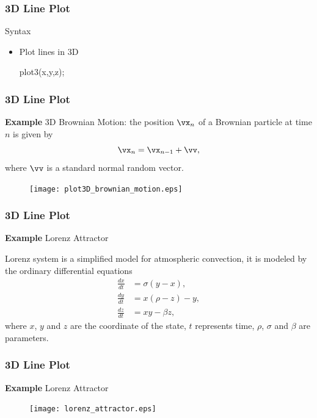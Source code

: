 \documentclass[compress]{beamer}  %
\begin{document}
\begin{frame}[fragile]
\frametitle{3D Line Plot}
\begin{block}{Syntax}
\begin{itemize}
    \item Plot lines in 3D
          \begin{matlabcodebeamer}[numbers=none,frame=none]
          plot3(x,y,z);
          \end{matlabcodebeamer}
\end{itemize}
\end{block}

\end{frame}
\begin{frame}[fragile]
\frametitle{3D Line Plot}
\textbf{Example} 3D Brownian Motion:
the position $\vx_n$ of a Brownian particle at time $n$ is given by
\begin{equation}
    \vx_n = \vx_{n-1} + \vv,
\end{equation}
where $\vv$ is a standard normal random vector.

\setcounter{subfigure}{0}
\begin{figure}
    \centering
    \texttt{[image: plot3D\_brownian\_motion.eps]}
\end{figure}

\end{frame}
\begin{frame}[fragile]
\frametitle{3D Line Plot}
\textbf{Example} Lorenz Attractor

Lorenz system is a simplified model for atmospheric convection, it is modeled by the ordinary differential equations
 \begin{align}
\frac{dx}{dt} &= \sigma (y - x), \\
\frac{dy}{dt} &= x (\rho - z) - y, \\
\frac{dz}{dt} &= x y - \beta z,
\end{align} 
where $x$, $y$ and $z$ are the coordinate of the state, $t$ represents time, $\rho$, $\sigma$ and $\beta$ are parameters.


\end{frame}
\begin{frame}[fragile]
\frametitle{3D Line Plot}
\textbf{Example} Lorenz Attractor

\setcounter{subfigure}{0}
\begin{figure}
    \centering
    \texttt{[image: lorenz\_attractor.eps]}
\end{figure}

\end{frame}
\end{document}
